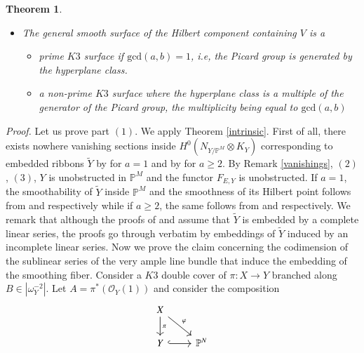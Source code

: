 \documentclass[11pt,twoside]{amsart}
\theoremstyle{plain}
\numberwithin{equation}{section}
\newtheorem{theorem}{Theorem}[section]
\theoremstyle{definition}
\begin{document}
\begin{theorem}
\begin{itemize}
    \item[(3)] The general smooth surface of the Hilbert component containing $V$ is a 
    \begin{itemize}
        \item[(a)] prime $K3$ surface if $\textrm{gcd}(a,b) = 1$, i.e, the Picard group is generated by the hyperplane class.
        \item[(b)] a non-prime $K3$ surface where the hyperplane class is a multiple of the generator of the Picard group, the multiplicity being equal to $\textrm{gcd}(a,b)$
    \end{itemize}
\end{itemize}

\end{theorem}

\noindent\textit{Proof.} Let us prove part $(1)$. We apply Theorem \ref{intrinsic}. First of all, there exists nowhere vanishing sections inside $H^0(N_{Y/\mathbb{P}^M} \otimes K_Y)$ corresponding to embedded ribbons $\widetilde{Y}$ by \cite[Theorem $1.7$]{GP97} for $a = 1$ and  by \cite[Theorem $3.1$]{PMR21} for $a \geq 2$. By Remark \ref{vanishings}, $(2)$, $(3)$, $Y$ is unobstructed in $\mathbb{P}^M$ and the functor $F_{E, Y}$ is unobstructed. If $a = 1$, the smoothability of $\widetilde{Y}$ inside $\mathbb{P}^M$ and the smoothness of its Hilbert point follows from \cite[Corollary $2.9$]{GGP13} and \cite[Theorem $4.1$]{GP97} respectively while if $a \geq 2$, the same follows from \cite[Theorem $4.1$]{PMR21} and \cite[Theorem $5.1$]{PMR21} respectively. We remark that although the proofs of \cite[Theorem $4.1$]{PMR21} and \cite[Theorem $5.1$]{PMR21} assume that $\widetilde{Y}$ is embedded by a complete linear series, the proofs go through verbatim by embeddings of $\widetilde{Y}$ induced by an incomplete linear series. Now we prove the claim concerning the codimension of the sublinear series of the very ample line bundle that induce the embedding of the smoothing fiber. 
Consider a $K3$ double cover of $\pi:X \to Y$ branched along $B \in |\omega_Y^{-2}|$. Let $A = \pi^*(\mathcal{O}_{Y}(1))$ and consider the composition  
\[
\begin{tikzcd}
X \arrow[dr, "\varphi"] \arrow[d, "\pi"] & \\
Y \arrow[r, hook] & \mathbb{P}^N
\end{tikzcd}
\]
\end{document}
